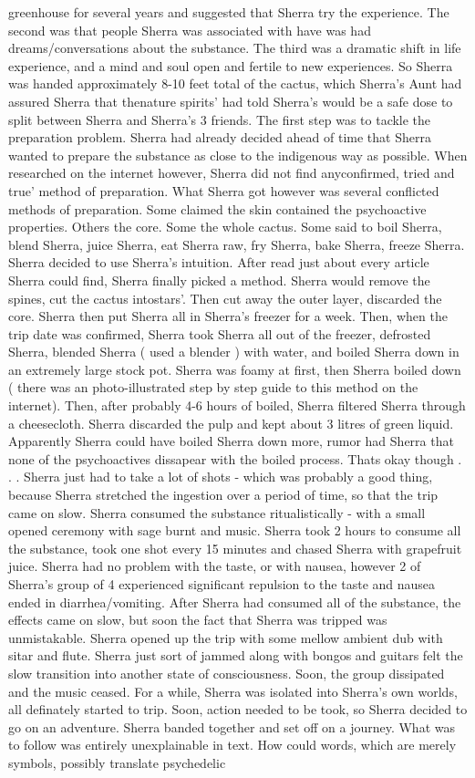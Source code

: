 \documentclass[12pt]{book}
\begin{document}
greenhouse for several years and suggested that Sherra try the experience. The second was that people Sherra was associated with have was had dreams/conversations about the substance. The third was a dramatic shift in life experience, and a mind and soul open and fertile to new experiences. So Sherra was handed approximately 8-10 feet total of the cactus, which Sherra's Aunt had assured Sherra that thenature spirits' had told Sherra's would be a safe dose to split between Sherra and Sherra's 3 friends. The first step was to tackle the preparation problem. Sherra had already decided ahead of time that Sherra wanted to prepare the substance as close to the indigenous way as possible. When researched on the internet however, Sherra did not find anyconfirmed, tried and true' method of preparation. What Sherra got however was several conflicted methods of preparation. Some claimed the skin contained the psychoactive properties. Others the core. Some the whole cactus. Some said to boil Sherra, blend Sherra, juice Sherra, eat Sherra raw, fry Sherra, bake Sherra, freeze Sherra. Sherra decided to use Sherra's intuition. After read just about every article Sherra could find, Sherra finally picked a method. Sherra would remove the spines, cut the cactus intostars'. Then cut away the outer layer, discarded the core. Sherra then put Sherra all in Sherra's freezer for a week. Then, when the trip date was confirmed, Sherra took Sherra all out of the freezer, defrosted Sherra, blended Sherra ( used a blender ) with water, and boiled Sherra down in an extremely large stock pot. Sherra was foamy at first, then Sherra boiled down ( there was an photo-illustrated step by step guide to this method on the internet). Then, after probably 4-6 hours of boiled, Sherra filtered Sherra through a cheesecloth. Sherra discarded the pulp and kept about 3 litres of green liquid. Apparently Sherra could have boiled Sherra down more, rumor had Sherra that none of the psychoactives dissapear with the boiled process. Thats okay though . . .  Sherra just had to take a lot of shots - which was probably a good thing, because Sherra stretched the ingestion over a period of time, so that the trip came on slow. Sherra consumed the substance ritualistically - with a small opened ceremony with sage burnt and music. Sherra took 2 hours to consume all the substance, took one shot every 15 minutes and chased Sherra with grapefruit juice. Sherra had no problem with the taste, or with nausea, however 2 of Sherra's group of 4 experienced significant repulsion to the taste and nausea ended in diarrhea/vomiting. After Sherra had consumed all of the substance, the effects came on slow, but soon the fact that Sherra was tripped was unmistakable. Sherra opened up the trip with some mellow ambient dub with sitar and flute. Sherra just sort of jammed along with bongos and guitars felt the slow transition into another state of consciousness. Soon, the group dissipated and the music ceased. For a while, Sherra was isolated into Sherra's own worlds, all definately started to trip. Soon, action needed to be took, so Sherra decided to go on an adventure. Sherra banded together and set off on a journey. What was to follow was entirely unexplainable in text. How could words, which are merely symbols, possibly translate psychedelic 
\end{document}
